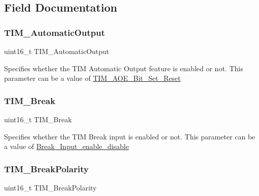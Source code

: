 \subsection{Field Documentation}
\mbox{\label{struct_t_i_m___b_d_t_r_init_type_def_a85ef0b5598749ffd67dd360e615bcf9a}} 
\subsubsection{\texorpdfstring{TIM\_AutomaticOutput}{TIM\_AutomaticOutput}}
{\footnotesize\ttfamily uint16\+\_\+t T\+I\+M\+\_\+\+Automatic\+Output}

Specifies whether the T\+IM Automatic Output feature is enabled or not. This parameter can be a value of \mbox{\hyperlink{group___t_i_m___a_o_e___bit___set___reset}{T\+I\+M\+\_\+\+A\+O\+E\+\_\+\+Bit\+\_\+\+Set\+\_\+\+Reset}} \mbox{\label{struct_t_i_m___b_d_t_r_init_type_def_a7f141e06bab7928bc0b8327f0d20e664}} 
\subsubsection{\texorpdfstring{TIM\_Break}{TIM\_Break}}
{\footnotesize\ttfamily uint16\+\_\+t T\+I\+M\+\_\+\+Break}

Specifies whether the T\+IM Break input is enabled or not. This parameter can be a value of \mbox{\hyperlink{group___break___input__enable__disable}{Break\+\_\+\+Input\+\_\+enable\+\_\+disable}} \mbox{\label{struct_t_i_m___b_d_t_r_init_type_def_a71f25c4b4d7207152436dd716a6cb2f1}} 
\subsubsection{\texorpdfstring{TIM\_BreakPolarity}{TIM\_BreakPolarity}}
{\footnotesize\ttfamily uint16\+\_\+t T\+I\+M\+\_\+\+Break\+Polarity}

